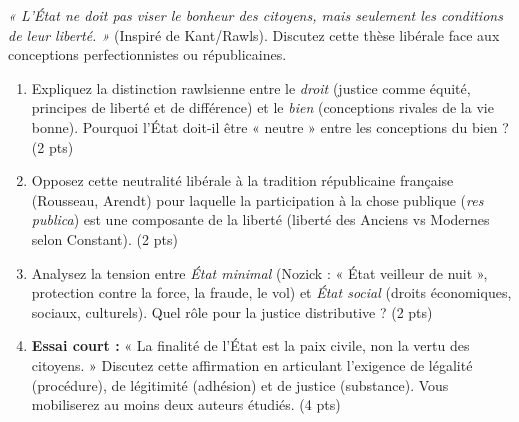 \documentclass[11pt]{article}
\begin{document}
\begin{exercice}
\emph{« L'État ne doit pas viser le bonheur des citoyens, mais seulement les conditions de leur liberté. »} (Inspiré de Kant/Rawls). Discutez cette thèse libérale face aux conceptions perfectionnistes ou républicaines.

\begin{enumerate}
    \item Expliquez la distinction rawlsienne entre le \emph{droit} (justice comme équité, principes de liberté et de différence) et le \emph{bien} (conceptions rivales de la vie bonne). Pourquoi l'État doit-il être « neutre » entre les conceptions du bien ? (2 pts)
    \item Opposez cette neutralité libérale à la tradition républicaine française (Rousseau, Arendt) pour laquelle la participation à la chose publique (\emph{res publica}) est une composante de la liberté (liberté des Anciens vs Modernes selon Constant). (2 pts)
    \item Analysez la tension entre \emph{État minimal} (Nozick : « État veilleur de nuit », protection contre la force, la fraude, le vol) et \emph{État social} (droits économiques, sociaux, culturels). Quel rôle pour la justice distributive ? (2 pts)
    \item \textbf{Essai court :} « La finalité de l'État est la paix civile, non la vertu des citoyens. » Discutez cette affirmation en articulant l'exigence de légalité (procédure), de légitimité (adhésion) et de justice (substance). Vous mobiliserez au moins deux auteurs étudiés. (4 pts)
\end{enumerate}
\end{exercice}
\end{document}
